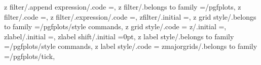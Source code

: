 {z filter/.append expression/.code                                  =,                                                                          
z filter/.belongs to family                                        =/pgfplots,                                                                                                                         
z filter/.code                                                     ={},                                                                                                                                
z filter/.expression/.code                                         =,                                                                                 
zfilter/.initial                                                   =,%
z grid style/.belongs to family                                    =/pgfplots/style commands,                                                                                                          
z grid style/.code                                                 ={%
z/.initial                                                         =,                                                                                                                                  
zlabel/.initial                                                    =,                                                                                                                                  
zlabel shift/.initial                                              =0pt,                                                                                                                               
z label style/.belongs to family                                   =/pgfplots/style commands,                                                                                                          
z label style/.code                                                ={%
zmajorgrids/.belongs to family                                     =/pgfplots/tick,                                                                                                                    
}}}
